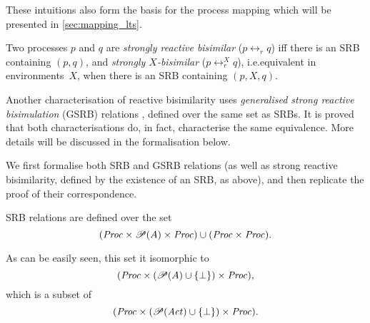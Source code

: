 \begin{isabellebody}
\begin{isamarkuptext}
These intuitions also form the basis for the process mapping which will be presented in \cref{sec:mapping_lts}.%
\end{isamarkuptext}\isamarkuptrue%
%
\isadelimdocument
%
\endisadelimdocument
%
\isatagdocument
%
\isamarkuptrue%
%
\endisatagdocument
{\isafolddocument}%
%
\isadelimdocument
%
\endisadelimdocument
%
\begin{isamarkuptext}%
Two processes $p$ and $q$ are \emph{strongly reactive bisimilar} ($p \leftrightarrow_r q$) iff there is an SRB containing $(p,q)$, and \emph{strongly $X$-bisimilar} ($p \leftrightarrow_r^X q$), i.e.\@ equivalent in environments~$X$, when there is an SRB containing $(p,X,q)$.%
\end{isamarkuptext}\isamarkuptrue%
%
\isadelimdocument
%
\endisadelimdocument
%
\isatagdocument
%
\isamarkuptrue%
%
\endisatagdocument
{\isafolddocument}%
%
\isadelimdocument
%
\endisadelimdocument
%
\begin{isamarkuptext}%
Another characterisation of reactive bisimilarity uses \emph{generalised strong reactive bisimulation} (GSRB) relations \cite[definition 3]{rbs}, defined over the same set as SRBs. It is proved that both characterisations do, in fact, characterise the same equivalence. More details will be discussed in the formalisation below.%
\end{isamarkuptext}\isamarkuptrue%
%
\isadelimdocument
%
\endisadelimdocument
%
\isatagdocument
%
\isamarkuptrue%
%
\endisatagdocument
{\isafolddocument}%
%
\isadelimdocument
%
\endisadelimdocument
%
\begin{isamarkuptext}%
We first formalise both SRB and GSRB relations (as well as strong reactive bisimilarity, defined by the existence of an SRB, as above), and then replicate the proof of their correspondence.%
\end{isamarkuptext}\isamarkuptrue%
%
\isadelimdocument
%
\endisadelimdocument
%
\isatagdocument
%
\isamarkuptrue%
%
\endisatagdocument
{\isafolddocument}%
%
\isadelimdocument
%
\endisadelimdocument
%
\begin{isamarkuptext}%
SRB relations are defined over the set
$$(\mathit{Proc} \times \mathscr{P}(A) \times \mathit{Proc}) \cup (\mathit{Proc} \times \mathit{Proc}).$$

As can be easily seen, this set it isomorphic to
$$(\mathit{Proc} \times (\mathscr{P}(A) \cup \{\bot\}) \times \mathit{Proc}),$$
which is a subset of
$$(\mathit{Proc} \times (\mathscr{P}(\mathit{Act}) \cup \{\bot\}) \times \mathit{Proc}).$$ 


\end{isamarkuptext}
\end{isabellebody}
